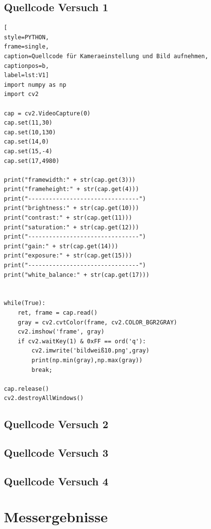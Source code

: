 \documentclass[12pt, oneside, a4paper, \docLanguage]{report}
\begin{document}
\subsection{Quellcode Versuch 1}
\label{chap:APPENDIX_SOURCECODE_V1}
\begin{lstlisting}[
style=PYTHON,
frame=single,
caption=Quellcode für Kameraeinstellung und Bild aufnehmen,
captionpos=b,
label=lst:V1]
import numpy as np
import cv2

cap = cv2.VideoCapture(0)
cap.set(11,30)
cap.set(10,130)
cap.set(14,0)
cap.set(15,-4)
cap.set(17,4980)

print("framewidth:" + str(cap.get(3)))
print("frameheight:" + str(cap.get(4)))
print("--------------------------------")
print("brightness:" + str(cap.get(10)))
print("contrast:" + str(cap.get(11)))
print("saturation:" + str(cap.get(12)))
print("--------------------------------")
print("gain:" + str(cap.get(14)))
print("exposure:" + str(cap.get(15)))
print("--------------------------------")
print("white_balance:" + str(cap.get(17)))


while(True):
    ret, frame = cap.read()
    gray = cv2.cvtColor(frame, cv2.COLOR_BGR2GRAY)
    cv2.imshow('frame', gray)
    if cv2.waitKey(1) & 0xFF == ord('q'):
        cv2.imwrite('bildweiß10.png',gray)
        print(np.min(gray),np.max(gray))
        break;
        
cap.release()
cv2.destroyAllWindows()
\end{lstlisting}

\subsection{Quellcode Versuch 2}
\label{chap:APPENDIX_SOURCECODE_V2}

\subsection{Quellcode Versuch 3}
\label{chap:APPENDIX_SOURCECODE_V3}

\subsection{Quellcode Versuch 4}
\label{chap:APPENDIX_SOURCECODE_V4}


\section{Messergebnisse}
\label{chap:APPENDIX_MEASUREMENT_SOURCE}

%
%

\end{document}
